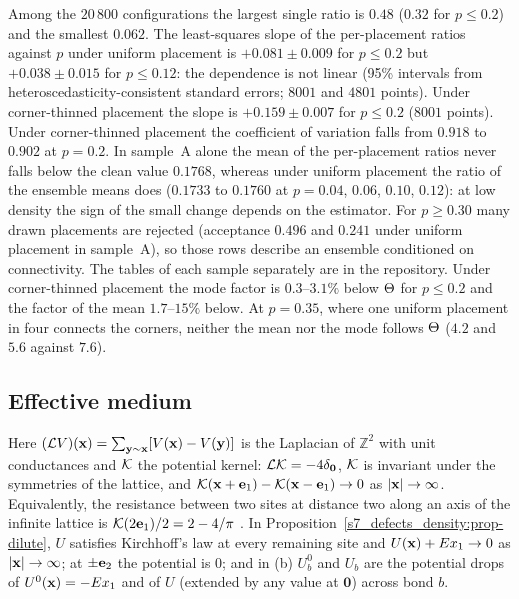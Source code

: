 Among the $20\,800$ configurations the largest single ratio is $0.48$ ($0.32$ for $p\le0.2$) and the smallest $0.062$. The
least-squares slope of the per-placement ratios against $p$ under uniform placement is $+0.081\pm0.009$ for $p\le0.2$ but
$+0.038\pm0.015$ for $p\le0.12$: the dependence is not linear (95\% intervals from heteroscedasticity-consistent standard
errors; $8001$ and $4801$ points). Under corner-thinned placement the slope is $+0.159\pm0.007$ for $p\le0.2$ ($8001$ points).
Under corner-thinned placement the coefficient of variation
falls from $0.918$ to $0.902$ at $p=0.2$. In sample~A alone the mean of the per-placement ratios never falls below the clean
value $0.1768$, whereas under uniform placement the ratio of the ensemble means does ($0.1733$ to $0.1760$ at $p=0.04$,
$0.06$, $0.10$, $0.12$): at low density the sign of the small change depends on the estimator. For $p\ge0.30$ many drawn
placements are rejected (acceptance $0.496$ and $0.241$ under uniform placement in sample~A), so those rows describe an
ensemble conditioned on connectivity. The tables of each sample separately are in the repository.
Under corner-thinned placement the mode factor is $0.3$--$3.1\%$ below $\Theta$ for $p\le0.2$ and the factor of the mean
$1.7$--$15\%$ below. At $p=0.35$, where one uniform placement in four connects the corners, neither the mean nor the mode
follows $\Theta$ ($4.2$ and $5.6$ against $7.6$).

\subsection{Effective medium}\label{sup_defects:ssec-emt}

Here $(\mathcal{L} V)(\mathbf{x})=\sum_{\mathbf{y}\sim\mathbf{x}}[V(\mathbf{x})-V(\mathbf{y})]$ is the Laplacian of $\mathbb Z^{2}$ with unit conductances and $\mathcal{K}$ the
potential kernel: $\mathcal{L}\mathcal{K}=-4\delta_{\mathbf 0}$, $\mathcal{K}$ is invariant under the symmetries of the lattice, and
$\mathcal{K}(\mathbf{x}+\mathbf{e}_1)-\mathcal{K}(\mathbf{x}-\mathbf{e}_1)\to0$ as $|\mathbf{x}|\to\infty$. Equivalently, the resistance between two sites at distance two
along an axis of the infinite lattice is $\mathcal{K}(2\mathbf{e}_1)/2=2-4/\pi$ \citep{Cserti2000}. In
Proposition~\ref{s7_defects_density:prop-dilute}, $U$ satisfies Kirchhoff's law at every remaining site and
$U(\mathbf{x})+Ex_1\to0$ as $|\mathbf{x}|\to\infty$; at $\pm\mathbf{e}_2$ the potential is $0$; and in (b) $U^{0}_{b}$ and $U_{b}$ are the
potential drops of $U^{0}(\mathbf{x})=-Ex_1$ and of $U$ (extended by any value at $\mathbf 0$) across bond $b$.

